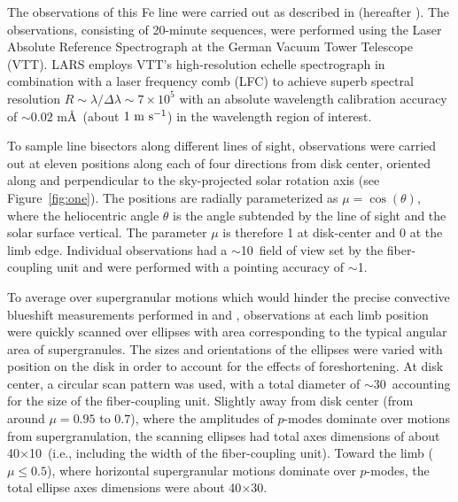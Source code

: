 \documentclass[twocolumn]{aastex63}
\newcommand{\ms}{{\rm m\ s}^{-1}}
\newcommand{\revise}[1]{#1}
\begin{document}


The observations of this Fe line were carried out as described in \citealt{Lohner-Bottcher2018} (hereafter ). The observations\revise{, consisting of 20-minute sequences,} were performed using the Laser Absolute Reference Spectrograph \citep[LARS,][]{Doerr2015, Lohner-Bottcher2017} at the German Vacuum Tower Telescope (VTT). LARS employs VTT's high-resolution echelle spectrograph in combination with a laser frequency comb (LFC) to achieve superb spectral resolution $R \sim \lambda/\Delta\lambda \sim 7 \times10^{5}$ with an absolute wavelength calibration accuracy of $\sim$$0.02$ m\AA\ (about $1\ \ms$) in the wavelength region of interest. \par 

To sample line bisectors along different lines of sight, observations were carried out at eleven positions along each of four directions from disk center, oriented along and perpendicular to the sky-projected solar rotation axis (see Figure~\ref{fig:one}). The positions are radially parameterized as $\mu = \cos(\theta)$, where the heliocentric angle $\theta$ is the angle subtended by the line of sight and the solar surface vertical. The parameter $\mu$ is therefore 1 at disk-center and 0 at the limb edge. Individual observations \revise{had a $\sim$10\arcsec\ field of view set by the fiber-coupling unit and} were performed with a pointing accuracy of $\sim$1\arcsec. \par

To average over supergranular motions which would hinder the precise convective blueshift measurements performed in  and , observations at each limb position were quickly scanned over ellipses with area corresponding to the typical angular area of supergranules. \revise{The sizes and orientations of the ellipses were varied with position on the disk in order to account for the effects of foreshortening. At disk center, a circular scan pattern was used, with a total diameter of $\sim$30\arcsec\ accounting for the size of the fiber-coupling unit. Slightly away from disk center (from around $\mu = 0.95$ to $0.7$), where the amplitudes of $p$-modes dominate over motions from supergranulation, the scanning ellipses had total axes dimensions of about 40\arcsec$\times$10\arcsec\ (i.e., including the width of the fiber-coupling unit). Toward the limb ($\mu \leq 0.5$), where horizontal supergranular motions dominate over $p$-modes, the total ellipse axes dimensions were about 40\arcsec$\times$30\arcsec.} \par 
\end{document}

